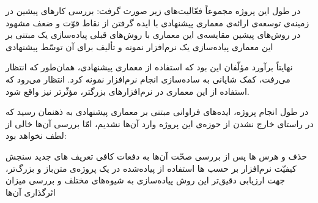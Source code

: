 
در طول این پروژه مجموعاً فعّالیت‌های زیر صورت گرفت:
 بررسی کارهای پیشین در زمینه‌ی توسعه‌ی 
 ارائه‌ی معماری پیشنهادی با ایده گرفتن از نقاط قوّت و ضعف مشهود در روش‌های پیشین
 مقایسه‌ی این معماری با روش‌های قبلی
 پیاده‌سازی یک   مبتنی بر این معماری
 پیاده‌سازی یک نرم‌افزار نمونه و تألیف  برای آن توسّط  پیشنهادی

نهایتاً برآورد مؤلّفان این بود که استفاده از معماری پیشنهادی، همان‌طور که انتظار می‌رفت، کمک شایانی به ساده‌سازی انجام  نرم‌افزار نمونه کرد. انتظار می‌رود که استفاده از این معماری در  نرم‌افزارهای بزرگتر، مؤثّرتر نیز واقع شود.

در طول انجام پروژه، ایده‌های فراوانی مبتنی بر معماری پیشنهادی به ذهنمان رسید که در راستای خارج نشدن از حوزه‌ی این پروژه وارد آن‌ها نشدیم، امّا بررسی آن‌ها خالی از لطف نخواهد بود:

 حذف و هرس ها پس از بررسی صحّت آن‌ها به دفعات کافی
 تعریف های جدید سنجش کیفیّت نرم‌افزار بر حسب ها
 استفاده از   پیاده‌شده در یک پروژه‌ی متن‌باز و بزرگ‌تر، جهت ارزیابی دقیق‌تر این روش
 پیاده‌سازی  به شیوه‌های مختلف و بررسی میزان اثرگذاری آن‌ها
